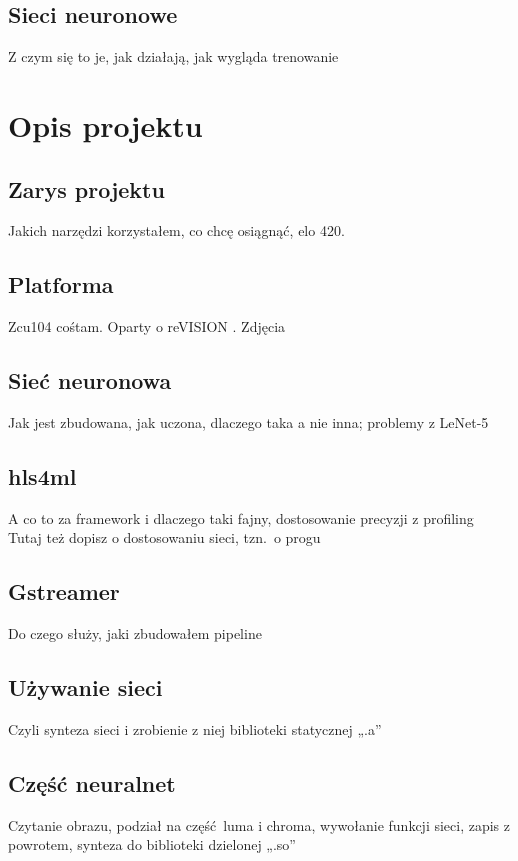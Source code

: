 \documentclass[12pt, oneside]{article}
\begin{document}
\subsection{Sieci neuronowe}
Z czym się to je, jak działają, jak wygląda trenowanie

\newpage
\section{Opis projektu}

\subsection{Zarys projektu}
Jakich narzędzi korzystałem, co chcę osiągnąć, elo 420.

\subsection{Platforma}
Zcu104 cośtam. Oparty o reVISION \texttrademark{}. Zdjęcia

\subsection{Sieć neuronowa}
Jak jest zbudowana, jak uczona, dlaczego taka a nie inna; problemy z LeNet-5

\subsection{hls4ml}
A co to za framework i dlaczego taki fajny, dostosowanie precyzji z profiling
Tutaj też dopisz o dostosowaniu sieci, tzn.\ o progu

\subsection{Gstreamer}
Do czego służy, jaki zbudowałem pipeline

\subsection{Używanie sieci}
Czyli synteza sieci i zrobienie z niej biblioteki statycznej „.a” 

\subsection{Część neuralnet}
Czytanie obrazu, podział na część luma i chroma, wywołanie funkcji sieci,
zapis z powrotem, synteza do biblioteki dzielonej „.so”
\end{document}
